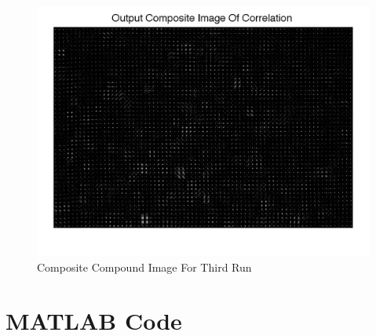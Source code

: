 \begin{figure}[h]
\centering
\includegraphics[width=\textwidth]{pics/figure1_run3.png}
\caption{Composite Compound Image For Third Run}
\label{pic:1r3}
\end{figure}





\chapter{MATLAB Code}\label{c:datasheets}






%
%
%

%
%
%
 
 
 

